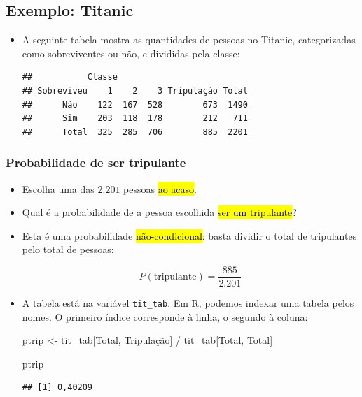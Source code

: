 \documentclass[
  11pt]{report}
\newenvironment{Shaded}{\begin{snugshade}}{\end{snugshade}}
\newcommand{\NormalTok}[1]{#1}
\newcommand{\OtherTok}[1]{\textcolor[rgb]{0.56,0.35,0.01}{#1}}
\newcommand{\SpecialCharTok}[1]{\textcolor[rgb]{0.00,0.00,0.00}{#1}}
\newcommand{\StringTok}[1]{\textcolor[rgb]{0.31,0.60,0.02}{#1}}
\renewenvironment{Shaded}{
    \begin{mdframed}[%
      roundcorner=2pt,%
      innerleftmargin=5pt,%
      innerrightmargin=5pt,%
      topline=true,%
      leftline=true,%
      rightline=true,%
      bottomline=true,%
      linewidth=0.5pt,%
      linecolor=black!20,%
      backgroundcolor=black!2,%
      skipabove=2ex,%
      skipbelow=2.5ex%
    ]%
  }
  {
    \end{mdframed}
  }
\begin{document}
\hypertarget{exemplo-titanic}{%
\subsection{Exemplo: Titanic}\label{exemplo-titanic}}

\begin{itemize}
\item
  A seguinte tabela mostra as quantidades de pessoas no Titanic, categorizadas como sobreviventes ou não, e divididas pela classe:

\begin{verbatim}
##           Classe
## Sobreviveu    1    2    3 Tripulação Total
##      Não    122  167  528        673  1490
##      Sim    203  118  178        212   711
##      Total  325  285  706        885  2201
\end{verbatim}
\end{itemize}

\hypertarget{probabilidade-de-ser-tripulante}{%
\subsubsection*{Probabilidade de ser tripulante}\label{probabilidade-de-ser-tripulante}}

\begin{itemize}
\item
  Escolha uma das $2.201$ pessoas {\hl{ao acaso}}.
\item
  Qual é a probabilidade de a pessoa escolhida {\hl{ser um tripulante}}?
\item
  Esta é uma probabilidade {\hl{não-condicional}}: basta dividir o total de tripulantes pelo total de pessoas:

  \[
  P(\text{tripulante}) = 
  \frac
  {885}
  {2.201}
  \]
\item
  A tabela está na variável \texttt{tit\_tab}. Em R, podemos indexar uma tabela pelos nomes. O primeiro índice corresponde à linha, o segundo à coluna:

\begin{Shaded}
\begin{Highlighting}[]
\NormalTok{ptrip }\OtherTok{\textless{}{-}} 
\NormalTok{  tit\_tab[}\StringTok{\textquotesingle{}Total\textquotesingle{}}\NormalTok{, }\StringTok{\textquotesingle{}Tripulação\textquotesingle{}}\NormalTok{] }\SpecialCharTok{/}\NormalTok{ tit\_tab[}\StringTok{\textquotesingle{}Total\textquotesingle{}}\NormalTok{, }\StringTok{\textquotesingle{}Total\textquotesingle{}}\NormalTok{]}

\NormalTok{ptrip}
\end{Highlighting}
\end{Shaded}

\begin{verbatim}
## [1] 0,40209
\end{verbatim}
\end{itemize}
\end{document}
